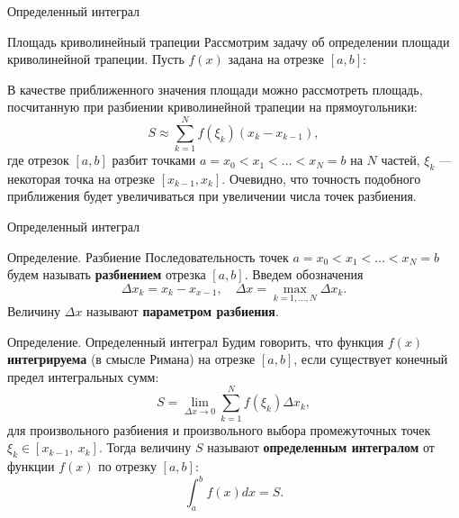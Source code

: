 \documentclass[8pt]{beamer}
\begin{document}
\begin{frame}{Определенный интеграл}
\begin{block}{Площадь криволинейный трапеции}
Рассмотрим задачу об определении площади криволинейной трапеции. Пусть $f(x)$ задана на отрезке $[a,b]$:
\begin{center}
\end{center}
В качестве приближенного значения площади можно рассмотреть площадь, посчитанную при разбиении криволинейной трапеции на прямоугольники:
$$S\approx \sum_{k=1}^{N} f(\xi_k)(x_{k} - x_{k-1}),$$
где отрезок $[a,b]$ разбит точками $a = x_0<x_1<\ldots<x_{N} = b$ на $N$ частей, $\xi_k$ --- некоторая точка на отрезке $[x_{k-1},x_k]$. Очевидно, что точность подобного приближения будет увеличиваться при увеличении числа точек разбиения. 
\end{block}
\end{frame}

\begin{frame}{Определенный интеграл}
\begin{block}{Определение. Разбиение}
Последовательность точек  $a = x_0<x_1<\ldots<x_{N} = b$ будем называть {\bf разбиением} отрезка $[a,b]$. Введем обозначения
$$\Delta x_k = x_k - x_{x-1},\quad \Delta x  = \max_{k=1,\ldots,N} \Delta x_k.$$
Величину $\Delta x$ называют {\bf параметром разбиения}.
\end{block}
\begin{block}{Определение. Определенный интеграл}
Будим говорить, что функция $f(x)$ {\bf интегрируема} (в смысле Римана) на отрезке $[a,b]$, если существует конечный предел интегральных сумм:
$$S=\lim_{\Delta x\to0} \sum_{k=1}^{N} f(\xi_k)\Delta x_k,$$
для произвольного разбиения и произвольного выбора промежуточных точек $\xi_k\in[x_{k-1},\ x_k]$. Тогда величину $S$ называют {\bf определенным интегралом} от функции $f(x)$ по отрезку $[a,b]$:
$$\int_a^b f(x)dx = S.$$
\end{block}
\end{frame}
\end{document}
